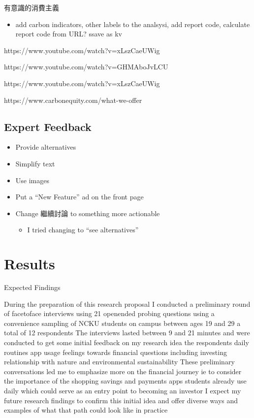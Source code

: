 \documentclass[
  letterpaper,
  DIV=11,
  numbers=noendperiod]{scrartcl}
\providecommand{\tightlist}{%
  \setlength{\itemsep}{0pt}\setlength{\parskip}{0pt}}\usepackage{longtable,booktabs,array}
\begin{document}
有意識的消費主義

\begin{itemize}
\tightlist
\item
  add carbon indicators, other labels to the analsysi, add report code,
  calculate report code from URL? ssave as kv
\end{itemize}

https://www.youtube.com/watch?v=xLszCaeUWig

https://www.youtube.com/watch?v=GHMAboJvLCU

https://www.youtube.com/watch?v=xLszCaeUWig

https://www.carbonequity.com/what-we-offer

\subsection{Expert Feedback}\label{expert-feedback}

\begin{itemize}
\item
  Provide alternatives
\item
  Simplify text
\item
  Use images
\item
  Put a ``New Feature'' ad on the front page
\item
  Change 繼續討論 to something more actionable

  \begin{itemize}
  \tightlist
  \item
    I tried changing to ``see alternatives''
  \end{itemize}
\end{itemize}

\newpage

\section{Results}\label{results}

Expected Findings

During the preparation of this research proposal I conducted a
preliminary round of facetoface interviews using 21 openended probing
questions using a convenience sampling of NCKU students on campus
between ages 19 and 29 a total of 12 respondents The interviews lasted
between 9 and 21 minutes and were conducted to get some initial feedback
on my research idea the respondents daily routines app usage feelings
towards financial questions including investing relationship with nature
and environmental sustainability These preliminary conversations led me
to emphasize more on the financial journey ie to consider the importance
of the shopping savings and payments apps students already use daily
which could serve as an entry point to becoming an investor I expect my
future research findings to confirm this initial idea and offer diverse
ways and examples of what that path could look like in practice
\end{document}
